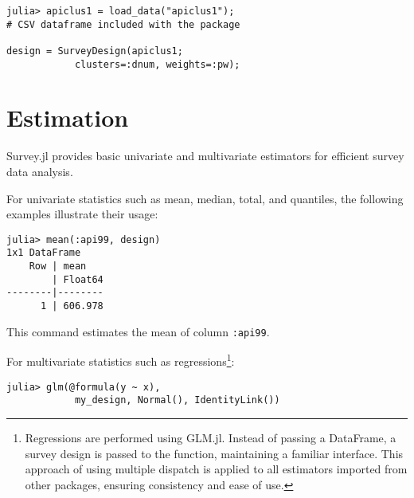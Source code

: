 \documentclass{juliacon}
\begin{document}
\begin{lstlisting}
julia> apiclus1 = load_data("apiclus1"); 
# CSV dataframe included with the package

design = SurveyDesign(apiclus1; 
            clusters=:dnum, weights=:pw);
    \end{lstlisting}


\section{Estimation}

Survey.jl provides basic univariate and multivariate estimators for efficient survey data analysis.

For univariate statistics such as mean, median, total, and quantiles, the following examples illustrate their usage:

\begin{lstlisting}
julia> mean(:api99, design)
1x1 DataFrame
    Row | mean    
        | Float64 
--------|--------
      1 | 606.978
    \end{lstlisting}
This command estimates the mean of column \verb|:api99|.

For multivariate statistics such as regressions\footnote{Regressions are performed using GLM.jl. Instead of passing a DataFrame, a survey design is passed to the function, maintaining a familiar interface. This approach of using multiple dispatch is applied to all estimators imported from other packages, ensuring consistency and ease of use.}:

\begin{lstlisting}
julia> glm(@formula(y ~ x),
            my_design, Normal(), IdentityLink())
\end{lstlisting}


\end{document}
